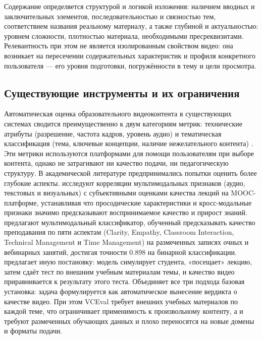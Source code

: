 Содержание определяется структурой и логикой изложения: наличием вводных и заключительных элементов, последовательностью и связностью тем,
соответствием названия реальному материалу, а также глубиной и актуальностью: уровнем сложности, плотностью материала, необходимыми пресреквизитами.
Релевантность при этом не является изолированным свойством видео:
она возникает на пересечении содержательных характеристик и профиля конкретного пользователя — его уровня подготовки, погружённости в тему и цели просмотра.

\subsection{Существующие инструменты и их ограничения}
Автоматическая оценка образовательного видеоконтента в существующих системах сводится преимущественно к двум категориям метрик:
технические атрибуты (разрешение, частота кадров, уровень аудио) и тематическая классификация (тема, ключевые концепции, наличие нежелательного контента) \cite{zhu2025vceval}.
Эти метрики используются платформами для помощи пользователям при выборе контента, однако не затрагивают ни качество подачи, ни педагогическую структуру.
В академической литературе предпринимались попытки оценить более глубокие аспекты.
\textcite{shi2019lecturevideoquality} исследуют корреляции мультимодальных признаков (аудио, текстовых и визуальных) с субъективными оценками качества лекций на MOOC-платформе,
устанавливая что просодические характеристики и кросс-модальные признаки значимо предсказывают воспринимаемое качество и прирост знаний.
\textcite{pan2022multimodal} предлагают мультимодальный классификатор, обученный предсказывать качество преподавания по пяти аспектам (Clarity, Empathy, Classroom Interaction,
Technical Management и Time Management) на размеченных записях очных и вебинарных занятий, достигая точности $0.898$ на бинарной классификации.
\textcite{zhu2025vceval} предлагает иную постановку: модель симулирует студента, «посещает» лекцию, затем сдаёт тест по внешним учебным материалам темы,
и качество видео приравнивается к результату этого теста.
Объединяет все три подхода базовая установка: задача формулируется как автоматическое вынесение вердикта о качестве видео.
При этом VCEval требует внешних учебных материалов по каждой теме, что ограничивает применимость к произвольному контенту, а
\textcite{shi2019lecturevideoquality} и \textcite{pan2022multimodal} требуют размеченных обучающих данных и плохо переносятся на новые домены и форматы подачи.


